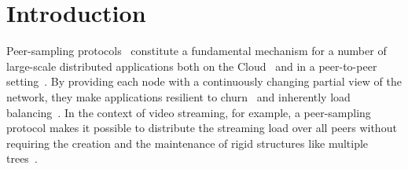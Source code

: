 
\section{Introduction}

Peer-sampling
protocols~\cite{jelasity2007gossip,tolgyeski2009adaptive,voulgaris2005cyclon}
constitute a fundamental mechanism for a number of large-scale distributed
applications both on the Cloud~\cite{decandia2007dynamo} and in a peer-to-peer
setting~\cite{Frey09Middleware,voulgaris2005sub,wuhib2009robust}. By providing
each node with a continuously changing partial view of the network, they make
applications resilient to churn~\cite{bertier-d2ht} and inherently load
balancing~\cite{Frey09DSN}. In the context of video streaming, for example, a
peer-sampling protocol makes it possible to distribute the streaming load over
all peers without requiring the creation and the maintenance of rigid structures
like multiple trees~\cite{Frey09DSN,monod:THESIS}.




